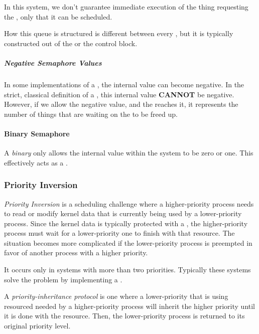 \begin{blackbox}
In this system, we don't guarantee immediate execution of the thing requesting the , only that it can be scheduled.
\end{blackbox}

How this queue is structured is different between every , but it is typically constructed out of the  or the  control block.

\subparagraph{Negative Semaphore Values}\label{subpar:Negative_Semaphore_Val}
In some implementations of a , the internal value can become negative.
In the strict, classical definition of a , this internal value \textbf{CANNOT} be negative.
However, if we allow the negative value, and the  reaches it, it represents the number of things that are waiting on the  to be freed up.

\paragraph{Binary Semaphore}\label{par:Binary_Semaphore}
A \emph{binary } only allows the internal value within the system to be zero or one.
This effectively acts as a .

\subsubsection{Priority Inversion}\label{subsubsec:Priority_Inversion}
\emph{Priority Inversion} is a scheduling challenge where a higher-priority process needs to read or modify kernel data that is currently being used by a lower-priority process.
Since the kernel data is typically protected with a , the higher-priority process must wait for a lower-priority one to finish with that resource.
The situation becomes more complicated if the lower-priority process is preempted in favor of another process with a higher priority.

It occurs only in systems with more than two priorities.
Typically these systems solve the problem by implementing a .

\begin{definition}\label{def:Priority_Inheritance_Protocol}
  A \emph{priority-inheritance protocol} is one where a lower-priority  that is using resourced needed by a higher-priority process will inherit the higher priority until it is done with the resource.
  Then, the lower-priority process is returned to its original priority level.
\end{definition}

